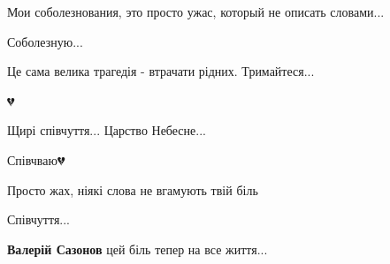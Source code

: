 
Мои соболезнования, это просто ужас, который не описать словами...


Соболезную...


Це сама велика трагедія - втрачати рідних. Тримайтеся...

💔


Щирі співчуття... Царство Небесне...


Співчваю💔🙏


Просто жах, ніякі слова не вгамують твій біль


Співчуття...

\begin{itemize} %
\textbf{Валерій Сазонов} цей біль тепер на все життя...
\end{itemize} %

